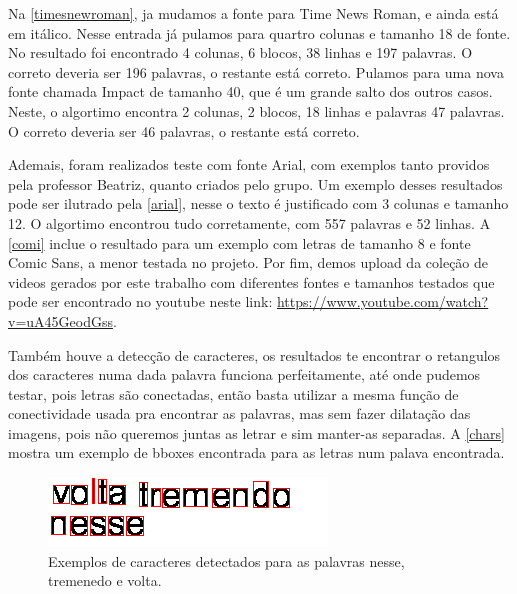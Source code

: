 \documentclass[english, 
               brazil, 
               bsc] %
               {dcomp-abntex2}
\begin{document}
Na \autoref{timesnewroman}, ja mudamos a fonte para Time News Roman, e ainda está em itálico. Nesse entrada já pulamos para quartro colunas e tamanho 18 de fonte. No resultado foi encontrado 4 colunas, 6 blocos, 38 linhas e 197 palavras. O correto deveria ser 196 palavras, o restante está correto. Pulamos para uma nova fonte chamada Impact de tamanho 40, que é um grande salto dos outros casos. Neste, o algortimo encontra 2 colunas, 2 blocos, 18 linhas e palavras 47 palavras. O correto deveria ser 46 palavras, o restante está correto.

Ademais, foram realizados teste com fonte Arial, com exemplos tanto providos pela professor Beatriz, quanto criados pelo grupo. Um exemplo desses resultados pode ser ilutrado pela \autoref{arial}, nesse o texto é justificado com 3 colunas e tamanho 12. O algortimo encontrou tudo corretamente, com 557 palavras e 52 linhas.  A \autoref{comi} inclue o resultado para um exemplo com letras de tamanho 8 e fonte Comic Sans, a menor testada no projeto. Por fim, demos upload da coleção de videos gerados por este trabalho com  diferentes fontes e tamanhos testados que pode ser encontrado no youtube neste link: \url{https://www.youtube.com/watch?v=uA45GeodGss}.

Também houve a detecção de caracteres, os resultados te encontrar o retangulos dos caracteres numa dada palavra funciona perfeitamente, até onde pudemos testar, pois letras são conectadas, então basta utilizar a mesma função de conectividade usada pra encontrar as palavras, mas sem fazer dilatação das imagens, pois não queremos juntas as letrar e sim manter-as separadas. A \autoref{chars} mostra um exemplo de bboxes encontrada para as letras num palava encontrada.


\begin{figure}[htb]
        \caption{\label{char} \small Exemplos de caracteres detectados para as palavras nesse, tremenedo e volta. }
        \begin{center}
            \includegraphics[scale=0.55]{./images/ocr.png}
        \end{center}
\end{figure}
\end{document}
